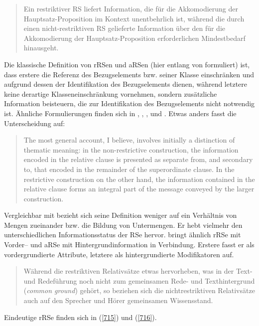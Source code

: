 \begin{quotation}
Ein restriktiver RS liefert Information, die für die Akkomodierung der Haupt\-satz-Proposition im Kontext unentbehrlich ist, während die durch einen nicht-restriktiven RS gelieferte Information über den für die Akkomodierung der Hauptsatz-Proposition erforderlichen Mindestbedarf hinausgeht.
\end{quotation}
Die klassische Definition von rRSen und aRSen (hier entlang von \citealt[193]{Schaffranietz1997} formuliert) ist, dass erstere die Referenz des Bezugselements bzw. seiner Klasse einschränken und aufgrund dessen der Identifikation des Bezugselements dienen, während letztere keine derartige Klasseneinschränkung vornehmen, sondern zusätzliche Information beisteuern, die zur Identifikation des Bezugselements nicht notwendig ist. Ähnliche Formulierungen finden sich in \citet[12-13]{Buscha1983}, \citet[268-272]{Eisenberg2004}, \citet[18, 32]{Birkner2008}, \citet[42]{Zifonun1997} und \citet[99-100]{Fritsch1990}.  Etwas anders fasst \citet[399]{Huddleston1984} die Unterscheidung auf: 

\begin{quotation}
The most general account, I believe, involves initially a distinction of thematic meaning: in the non-restrictive construction, the information encoded in the relative clause is presented as separate from, and secondary to, that encoded in the remainder of the superordinate clause. In the restrictive construction on the other hand, the information contained in the relative clause forms an integral part of the message conveyed by the larger construction.
\end{quotation}
Vergleichbar mit \citet{Bluehdorn2007} bezieht sich seine Definition weniger auf ein Verhältnis von Mengen zueinander bzw. die Bildung von Untermengen. Er hebt vielmehr den unterschiedlichen Informationsstatus der RSe hervor. \citet[85-86]{Abraham2012} bringt ähnlich rRSe mit Vorder– und aRSe mit Hintergrundinformation in Verbindung. Erstere fasst er als vordergrundierte Attribute, letztere als hintergrundierte Modifikatoren auf.

\begin{quotation}
Während die restriktiven Relativsätze etwas hervorheben, was in der Text- und Redeführung noch nicht zum gemeinsamen Rede- und Texthintergrund (\textit{common ground}) gehört, so beziehen sich die nichtrestriktiven Re\-lativsätze auch auf den Sprecher und Hörer gemeinsamen Wissensstand.
\end{quotation}
Eindeutige rRSe finden sich in (\ref{715}) und (\ref{716}).

